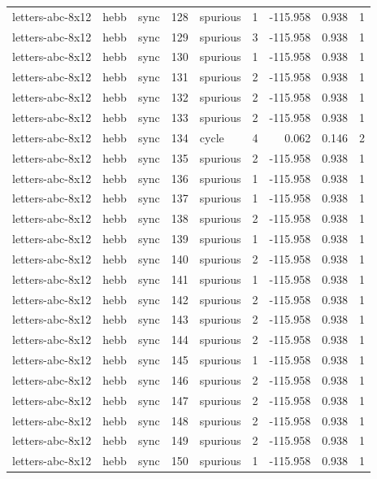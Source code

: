 \begin{tabular}{lllrlrrrr}
letters-abc-8x12 & hebb & sync & 128 & spurious & 1 & -115.958 & 0.938 & 1 \\
letters-abc-8x12 & hebb & sync & 129 & spurious & 3 & -115.958 & 0.938 & 1 \\
letters-abc-8x12 & hebb & sync & 130 & spurious & 1 & -115.958 & 0.938 & 1 \\
letters-abc-8x12 & hebb & sync & 131 & spurious & 2 & -115.958 & 0.938 & 1 \\
letters-abc-8x12 & hebb & sync & 132 & spurious & 2 & -115.958 & 0.938 & 1 \\
letters-abc-8x12 & hebb & sync & 133 & spurious & 2 & -115.958 & 0.938 & 1 \\
letters-abc-8x12 & hebb & sync & 134 & cycle & 4 & 0.062 & 0.146 & 2 \\
letters-abc-8x12 & hebb & sync & 135 & spurious & 2 & -115.958 & 0.938 & 1 \\
letters-abc-8x12 & hebb & sync & 136 & spurious & 1 & -115.958 & 0.938 & 1 \\
letters-abc-8x12 & hebb & sync & 137 & spurious & 1 & -115.958 & 0.938 & 1 \\
letters-abc-8x12 & hebb & sync & 138 & spurious & 2 & -115.958 & 0.938 & 1 \\
letters-abc-8x12 & hebb & sync & 139 & spurious & 1 & -115.958 & 0.938 & 1 \\
letters-abc-8x12 & hebb & sync & 140 & spurious & 2 & -115.958 & 0.938 & 1 \\
letters-abc-8x12 & hebb & sync & 141 & spurious & 1 & -115.958 & 0.938 & 1 \\
letters-abc-8x12 & hebb & sync & 142 & spurious & 2 & -115.958 & 0.938 & 1 \\
letters-abc-8x12 & hebb & sync & 143 & spurious & 2 & -115.958 & 0.938 & 1 \\
letters-abc-8x12 & hebb & sync & 144 & spurious & 2 & -115.958 & 0.938 & 1 \\
letters-abc-8x12 & hebb & sync & 145 & spurious & 1 & -115.958 & 0.938 & 1 \\
letters-abc-8x12 & hebb & sync & 146 & spurious & 2 & -115.958 & 0.938 & 1 \\
letters-abc-8x12 & hebb & sync & 147 & spurious & 2 & -115.958 & 0.938 & 1 \\
letters-abc-8x12 & hebb & sync & 148 & spurious & 2 & -115.958 & 0.938 & 1 \\
letters-abc-8x12 & hebb & sync & 149 & spurious & 2 & -115.958 & 0.938 & 1 \\
letters-abc-8x12 & hebb & sync & 150 & spurious & 1 & -115.958 & 0.938 & 1 \\

\end{tabular}
